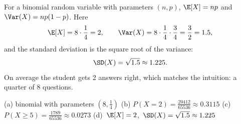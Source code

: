 \begin{solution}
	 For a binomial random variable with parameters $(n,p)$,
	$\E[X]=np$ and $\Var(X)=np(1-p)$. Here
	\[
		\E[X]=8\cdot\frac14=2,\qquad
		\Var(X)=8\cdot\frac14\cdot\frac34=\frac32=1.5,
	\]
	and the standard deviation is the square root of the variance:
	\[ \SD(X)=\sqrt{1.5}\approx1.225. \]
	On average the student gets 2 answers right, which matches the intuition:
	a quarter of 8 questions.

	\begin{answer}
		(a) binomial with parameters $(8,\frac14)$ \quad
		(b) $P(X=2)=\frac{20412}{65536}\approx0.3115$ \quad
		\mbox{(c) $P(X\ge5)=\frac{1789}{65536}\approx0.0273$} \quad
		\mbox{(d) $\E[X]=2$, $\SD(X)=\sqrt{1.5}\approx1.225$}
	\end{answer}
\end{solution}
